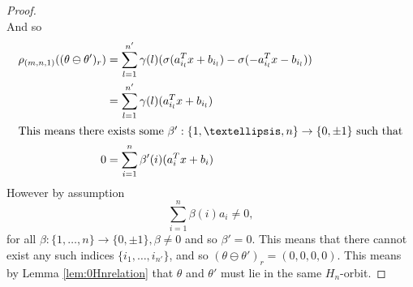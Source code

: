 \documentclass[10pt,a4paper]{amsart}
\begin{document}
\begin{proof}
$$    $$
    And so
    \begin{align*}
        \rho_{(m,n,1)}((\theta\ominus \theta')_r) &= \sum_{l=1}^{n'} \gamma(l)(\sigma(a_{i_l}^Tx+b_{i_l}) - \sigma(-a_{i_l}^Tx-b_{i_l}))\\
        &= \sum_{l=1}^{n'} \gamma(l)(a_{i_l}^Tx+b_{i_l})\\
        \intertext{This means there exists some $\beta':\{1, \ldots, n\}\rightarrow \{0, \pm 1\}$ such that}
       0 &= \sum_{i=1}^n \beta'(i)(a_{i}^Tx+b_{i})
    \end{align*}
    However by assumption
    $$
    \sum_{i=1}^n \beta(i) a_{i} \neq 0,
    $$
    for all $\beta:\{1, \ldots, n\}\rightarrow \{0, \pm 1\}, \beta\neq 0$ and so $\beta' =0$. This means that there cannot exist any such indices $\{i_1, \ldots, i_{n'}\}$, and so $(\theta\ominus\theta')_r=(0,0,0,0)$. This means by Lemma \ref{lem:0Hnrelation} that $\theta$ and $\theta'$ must lie in the same $H_n$-orbit.
\end{proof}
\end{document}
